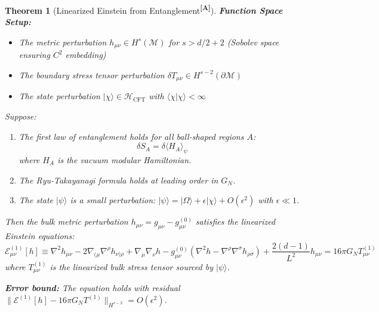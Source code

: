 \documentclass[12pt,a4paper]{article}
\newtheorem{theorem}{Theorem}[section]
\newcommand{\levelA}{\textsuperscript{\textcolor{green!50!black}{\textbf{[A]}}}}
\begin{document}
\begin{theorem}[Linearized Einstein from Entanglement\levelA]
\textbf{Function Space Setup:}
\begin{itemize}
    \item The metric perturbation $h_{\mu\nu} \in H^s(\mathcal{M})$ for $s > d/2 + 2$ (Sobolev space ensuring $C^2$ embedding)
    \item The boundary stress tensor perturbation $\delta T_{\mu\nu} \in H^{s-2}(\partial\mathcal{M})$
    \item The state perturbation $|\chi\rangle \in \mathcal{H}_{\text{CFT}}$ with $\langle \chi | \chi \rangle < \infty$
\end{itemize}

Suppose:
\begin{enumerate}
    \item The first law of entanglement holds for all ball-shaped regions $A$:
    \begin{equation}
    \delta S_A = \delta \langle H_A \rangle_\psi
    \end{equation}
    where $H_A$ is the vacuum modular Hamiltonian.
    \item The Ryu-Takayanagi formula holds at leading order in $G_N$.
    \item The state $|\psi\rangle$ is a small perturbation: $|\psi\rangle = |\Omega\rangle + \epsilon |\chi\rangle + O(\epsilon^2)$ with $\epsilon \ll 1$.
\end{enumerate}
Then the bulk metric perturbation $h_{\mu\nu} = g_{\mu\nu} - g^{(0)}_{\mu\nu}$ satisfies the linearized Einstein equations:
\begin{equation}
\mathcal{E}_{\mu\nu}^{(1)}[h] \equiv \nabla^2 h_{\mu\nu} - 2\nabla_{(\mu}\nabla^\rho h_{\nu)\rho} + \nabla_\mu \nabla_\nu h - g_{\mu\nu}^{(0)}(\nabla^2 h - \nabla^\rho\nabla^\sigma h_{\rho\sigma}) + \frac{2(d-1)}{L^2}h_{\mu\nu} = 16\pi G_N T_{\mu\nu}^{(1)}
\end{equation}
where $T_{\mu\nu}^{(1)}$ is the linearized bulk stress tensor sourced by $|\psi\rangle$.

\textbf{Error bound:} The equation holds with residual $\|\mathcal{E}^{(1)}[h] - 16\pi G_N T^{(1)}\|_{H^{s-2}} = O(\epsilon^2)$.
\end{theorem}
\end{document}
